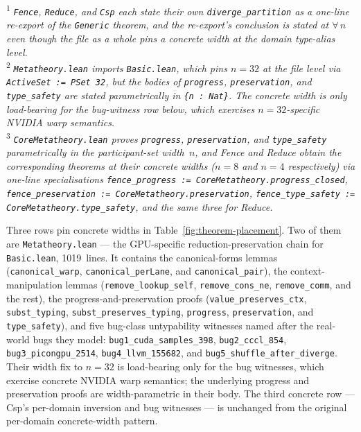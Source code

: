 \documentclass[acmsmall,screen,review,anonymous,nonacm]{acmart}
\begin{document}
\begin{table}[t]
\medskip
\noindent\textsuperscript{1} \textit{\texttt{Fence}, \texttt{Reduce}, and \texttt{Csp} each state their own \texttt{diverge\_partition} as a one-line re-export of the \texttt{Generic} theorem, and the re-export's conclusion is stated at $\forall\,n$ even though the file as a whole pins a concrete width at the domain type-alias level.}\\
\noindent\textsuperscript{2} \textit{\texttt{Metatheory.lean} imports \texttt{Basic.lean}, which pins $n = 32$ at the file level via \texttt{ActiveSet := PSet 32}, but the bodies of \texttt{progress}, \texttt{preservation}, and \texttt{type\_safety} are stated parametrically in \texttt{\{n : Nat\}}. The concrete width is only load-bearing for the bug-witness row below, which exercises $n = 32$-specific NVIDIA warp semantics.}\\
\noindent\textsuperscript{3} \textit{\texttt{CoreMetatheory.lean} proves \texttt{progress}, \texttt{preservation}, and \texttt{type\_safety} parametrically in the participant-set width~$n$, and Fence and Reduce obtain the corresponding theorems at their concrete widths ($n = 8$ and $n = 4$ respectively) via one-line specialisations \texttt{fence\_progress := CoreMetatheory.progress\_closed}, \texttt{fence\_preservation := CoreMetatheory.preservation}, \texttt{fence\_type\_safety := CoreMetatheory.type\_safety}, and the same three for Reduce.}
\end{table}

Three rows pin concrete widths in Table~\ref{fig:theorem-placement}. Two of them are \texttt{Metatheory.lean} --- the GPU-specific reduction-preservation chain for \texttt{Basic.lean}, 1019~lines. It contains the canonical-forms lemmas (\texttt{canonical\_warp}, \texttt{canonical\_perLane}, and \texttt{canonical\_pair}), the context-manipulation lemmas (\texttt{remove\_lookup\_self}, \texttt{remove\_cons\_ne}, \texttt{remove\_comm}, and the rest), the progress-and-preservation proofs (\texttt{value\_preserves\_ctx}, \texttt{subst\_typing}, \texttt{subst\_preserves\_typing}, \texttt{progress}, \texttt{preservation}, and \texttt{type\_safety}), and five bug-class untypability witnesses named after the real-world bugs they model: \texttt{bug1\_cuda\_samples\_398}, \texttt{bug2\_cccl\_854}, \texttt{bug3\_picongpu\_2514}, \texttt{bug4\_llvm\_155682}, and \texttt{bug5\_shuffle\_after\_diverge}. Their width fix to $n = 32$ is load-bearing only for the bug witnesses, which exercise concrete NVIDIA warp semantics; the underlying progress and preservation proofs are width-parametric in their body. The third concrete row --- Csp's per-domain inversion and bug witnesses --- is unchanged from the original per-domain concrete-width pattern.
\end{document}
